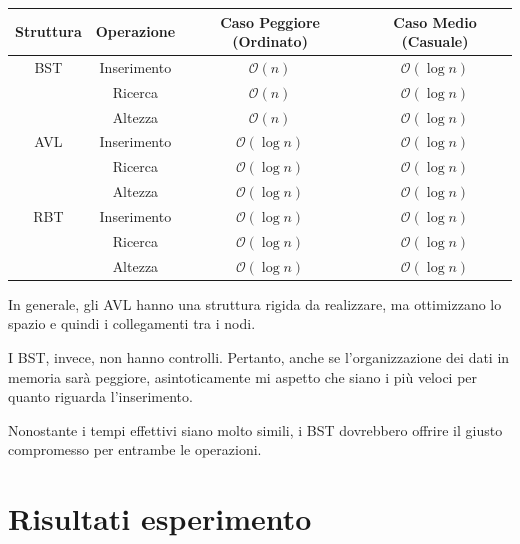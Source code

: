 \documentclass{article}
\begin{document}
\begin{table}[h!]
    \centering
    \renewcommand{\arraystretch}{1.9} 
    
    \begin{tabular}{|c|c|c|c|}
        \hline
        \textbf{Struttura} & \textbf{Operazione} & \textbf{Caso Peggiore (Ordinato)} & \textbf{Caso Medio (Casuale)} \\
        \hline
        BST & Inserimento & $\mathcal{O}(n)$ & $\mathcal{O}(\log n)$ \\
        \hline
         & Ricerca & $\mathcal{O}(n)$ & $\mathcal{O}(\log n)$ \\
        \hline
         & Altezza & $\mathcal{O}(n)$ & $\mathcal{O}(\log n)$ \\
        \hline
        AVL & Inserimento & $\mathcal{O}(\log n)$ & $\mathcal{O}(\log n)$ \\
        \hline
         & Ricerca & $\mathcal{O}(\log n)$ & $\mathcal{O}(\log n)$ \\
        \hline
         & Altezza & $\mathcal{O}(\log n)$ & $\mathcal{O}(\log n)$ \\
        \hline
        RBT & Inserimento & $\mathcal{O}(\log n)$ & $\mathcal{O}(\log n)$ \\
        \hline
         & Ricerca & $\mathcal{O}(\log n)$ & $\mathcal{O}(\log n)$ \\
        \hline
         & Altezza & $\mathcal{O}(\log n)$ & $\mathcal{O}(\log n)$ \\
        \hline
    \end{tabular}
\end{table}

In generale, gli AVL hanno una struttura rigida da realizzare, ma ottimizzano lo spazio e quindi i collegamenti tra i nodi.

I BST, invece, non hanno controlli. Pertanto, anche se l'organizzazione dei dati in memoria sarà peggiore, asintoticamente mi aspetto che siano i più veloci per quanto riguarda l'inserimento.

Nonostante i tempi effettivi siano molto simili, i BST dovrebbero offrire il giusto compromesso per entrambe le operazioni.



\clearpage
\section{Risultati esperimento}
\end{document}
